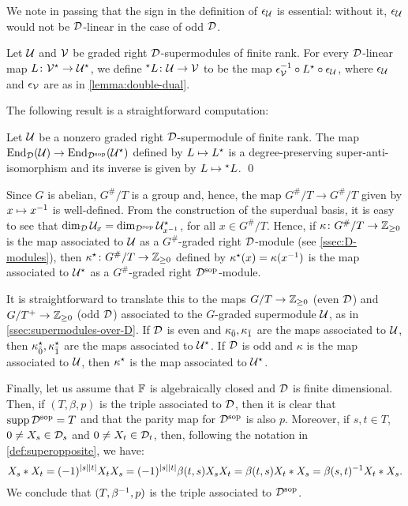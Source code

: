 We note in passing that the sign in the definition of $\epsilon_\mathcal U$ is essential: without it, $\epsilon_\mathcal U$ would not be $\mathcal{D}$-linear in the case of odd $\mathcal{D}$. 

\begin{defi}\label{def:other-Star}
    Let $\mathcal U$ and $\mathcal V$ be graded right $\mathcal{D}$-supermodules of finite rank.
    For every $\mathcal{D}$-linear map $L\colon \mathcal V^\star \to \mathcal U^\star$, we define ${}^\star L\colon \mathcal U \to \mathcal V$ to be the map $\epsilon_\mathcal V^{-1} \circ L^\star \circ \epsilon_\mathcal U$, where $\epsilon_\mathcal U$ and $\epsilon_\mathcal V$ are as in \cref{lemma:double-dual}.
\end{defi}

The following result is a straightforward computation:

\begin{prop}\label{prop:dual-super-anti-iso}
    Let $\mathcal U$ be a nonzero graded right $\mathcal{D}$-supermodule of finite rank. 
    The map $\operatorname{End}_{\mathcal{D}} (\mathcal U) \rightarrow \operatorname{End}_{\mathcal{D}^{\mathrm{sop}}} (\mathcal U^\star)$ defined by $L \mapsto L^\star$ is a degree-preserving super-anti-isomorphism and its inverse is given by $L \mapsto {}^\star L$. \qed
\end{prop}

Since $G$ is abelian, $G^\#/T$ is a group and, hence, the map $G^\#/T \to G^\#/T$ given by $x \mapsto x^{-1}$ is well-defined. 
From the construction of the superdual basis, it is easy to see that $\dim_{\mathcal{D}} \mathcal U_x = \dim_{\mathcal{D}^{\mathrm{sop}}} \mathcal U^\star_{x^{-1}}$, for all $x \in G^\#/T$. 
Hence, if $\kappa\colon G^\#/T \to \mathbb{Z}_{\geq 0}$ is the map associated to $\mathcal U$ as a $G^\#$-graded right $\mathcal{D}$-module (see \cref{ssec:D-modules}), then $\kappa^\star \colon G^\#/T \to \mathbb{Z}_{\geq 0}$ defined by $\kappa^\star (x) = \kappa (x^{-1})$ is the map associated to $\mathcal U^\star$ as a $G^\#$-graded right $\mathcal{D}^{\mathrm{sop}}$-module.

It is straightforward to translate this to the maps $G/T \to \mathbb{Z}_{\geq 0}$ (even $\mathcal{D}$) and $G/T^+ \to \mathbb{Z}_{\geq 0}$ (odd $\mathcal{D}$) associated to the $G$-graded supermodule $\mathcal U$, as in \cref{ssec:supermodules-over-D}. 
If $\mathcal{D}$ is even and $\kappa_{\bar{0}}, \kappa_{\bar{1}}$ are the maps associated to $\mathcal U$, then $\kappa_{\bar{0}}^\star, \kappa_{\bar{1}}^\star$ are the maps associated to $\mathcal U^\star$. 
If $\mathcal{D}$ is odd and $\kappa$ is the map associated to $\mathcal U$, then $\kappa^\star$ is the map associated to $\mathcal U^\star$.

Finally, let us assume that $\mathbb{F}$ is algebraically closed and $\mathcal{D}$ is finite dimensional. 
Then, if $(T, \beta, p)$ is the triple associated to $\mathcal{D}$, then it is clear that $\operatorname{supp} \mathcal{D}^{\mathrm{sop}} = T$ and that the parity map for $\mathcal{D}^{\mathrm{sop}}$ is also $p$. 
Moreover, if $s,t \in T$, $0 \neq X_s \in \mathcal{D}_s$ and $0 \neq X_t \in \mathcal{D}_t$, then, following the notation in \cref{def:superopposite}, we have:
\[
    X_s * X_t = (-1)^{|s||t|} X_tX_s = (-1)^{|s||t|} \beta(t, s) X_sX_t = \beta(t, s) X_t*X_s = \beta(s, t)^{-1} X_t*X_s.
\]
We conclude that $(T,\beta^{-1}, p)$ is the triple associated to $\mathcal{D}^{\mathrm{sop}}$.